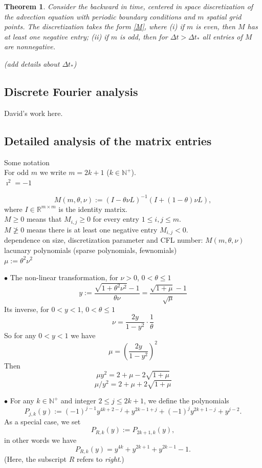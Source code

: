 \documentclass[a4paper]{article}
\newtheorem{theorem}{Theorem}
\newcommand{\dt}{\Delta t}
\newcommand{\te}{\theta}
\newcommand{\nplus}{\mathbb{N}^+}
\newcommand{\rr}{\mathbb{R}}
\newcommand{\Por}{P_{R,k}(y)}
\begin{document}
\begin{theorem}
Consider the backward in time, centered in space discretization of the
advection equation with periodic boundary conditions and $m$ spatial grid
points.  The discretization takes the form \eqref{M},
where (i) if $m$ is even, then $M$ has at least one negative entry;
(ii) if $m$ is odd, then for $\dt>\dt_*$ all entries of $M$ are nonnegative.

(add details about $\dt_*$)
\end{theorem}

\subsection{Discrete Fourier analysis}
David's work here.

\subsection{Detailed analysis of the matrix entries}
Some notation \\

For odd $m$ we write $m=2k+1$ ($k\in\nplus$).\\

$\imath^2=-1$ 

\[
M(m,\te,\nu):=(I-\te\nu L)^{-1}(I+(1-\te)\nu L),
\]
where $I\in\rr^{m\times m}$ is the identity matrix.\\

$M\ge 0$ means that  $M_{i,j}\ge 0$ for every entry $1\le i, j\le m$.\\

$M\not\ge 0$ means there is at least one negative entry $M_{i,j}<0$.\\

dependence on size, discretization parameter and CFL number: $M(m,\te,\nu)$\\

lacunary polynomials (sparse polynomials, fewnomials)\\

$\mu:=\te^2\nu^2$

$\bullet$ The non-linear transformation, for $\nu>0$, $0<\te\le 1$
\[
y:=\frac{\sqrt{1+\te^2\nu^2}-1}{\te\nu}=\frac{\sqrt{1+\mu}-1}{\sqrt{\mu}}
\]
Its inverse, for $0<y<1$, $0<\te\le 1$
\[
\nu=\frac{2y}{1-y^2}\cdot\frac{1}{\te}
\]
So for any $0<y<1$ we have
\[
\mu=\left(\frac{2y}{1-y^2}\right)^2
\]
Then
\[\mu y^2=2+\mu-2\sqrt{1+\mu}\]
\[\mu/y^2=2+\mu+2\sqrt{1+\mu}\]

$\bullet$ For any $k\in\nplus$ and integer $2\le j\le 2k+1$, we define the polynomials
\[
P_{j,k}(y):=(-1)^{j-1} y^{4 k+2-j}+y^{2 k-1+j}+(-1)^j y^{2 k+1-j}+y^{j-2}.
\]
As a special case, we set
\[
\Por:=P_{2k+1,k}(y),
\]
in other words we have
\[\Por=y^{4 k}+y^{2 k+1}+y^{2 k-1}-1.\]
(Here, the subscript $R$ refers to \textit{right}.)
\end{document}
